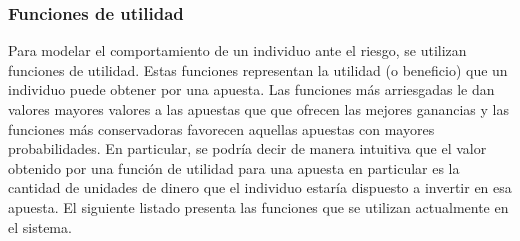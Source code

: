\subsubsection{Funciones de utilidad}
Para modelar el comportamiento de un individuo ante el riesgo, se utilizan funciones de utilidad. Estas funciones representan la utilidad (o beneficio) que un individuo puede obtener por una apuesta. Las funciones más arriesgadas le dan valores mayores valores a las apuestas que que ofrecen las mejores ganancias y las funciones más conservadoras favorecen aquellas apuestas con mayores probabilidades.
En particular, se podría decir de manera intuitiva que el valor obtenido por una función de utilidad para una apuesta en particular es la cantidad de unidades de dinero que el individuo estaría dispuesto a invertir en esa apuesta.
El siguiente listado presenta las funciones que se utilizan actualmente en el sistema.
